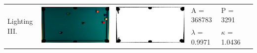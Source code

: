 \begin{tabular}{|l|c|c|l|l|c|}
\multirow{2}{*}{Lighting III.} & \multirow{2}{*}{\includegraphics[scale=0.05]{../images/1/14_img.png}} & \multirow{2}{*}{\includegraphics[scale=0.05]{../images/1/14_mask.png}} & A = 368783 & P = 3291 & \multirow{2}{*}{}\\ 
& & & $\lambda$ = 0.9971 & $\kappa$ = 1.0436 & \\
\hline


\end{tabular}
